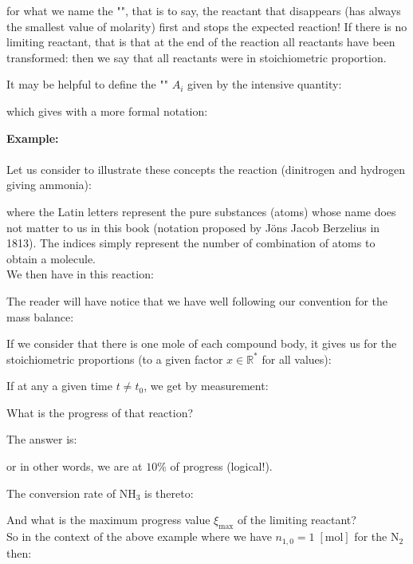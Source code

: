 	for what we name the "", that is to say, the reactant that disappears (has always the smallest value of molarity) first and stops the expected reaction! If there is no limiting reactant, that is that at the end of the reaction all reactants have been transformed: then we say that all reactants were in stoichiometric proportion.
	
	It may be helpful to define the "" $A_i$ given by the intensive quantity:
	
	
	which gives with a more formal notation:
	
	\begin{tcolorbox}[colframe=black,colback=white,sharp corners]
	\textbf{{\Large {}}Example:}\\\\
	Let us consider to illustrate these concepts the reaction (dinitrogen and hydrogen giving ammonia):
	
	where the Latin letters represent the pure substances (atoms) whose name does not matter to us in this book (notation proposed by Jöns Jacob Berzelius in 1813). The indices simply represent the number of combination of atoms to obtain a molecule. \\

	We then have in this reaction:
	
	The reader will have notice that we have well following our convention for the mass balance:
	
	If we consider that there is one mole of each compound body, it gives us for the stoichiometric proportions (to a given factor $x\in\mathbb{R}^{*}$ for all values):
	
	If at any a given time $t\neq t_0$, we get by measurement:
	
	What is the progress of that reaction?

	The answer is:
	
	or in other words, we are at $10\%$ of progress (logical!).\\
	\end{tcolorbox}
	
	\begin{tcolorbox}[colframe=black,colback=white,sharp corners]
	The conversion rate of $\mathrm{NH}_3$ is thereto:
	
	And what is the maximum progress value $\xi_{\max}$ of the limiting reactant?\\

	So in the context of the above example where we have $n_{1,0}=1\;[\text{mol}]$ for the $\mathrm{N}_2$ then:
	
	\end{tcolorbox}
	
